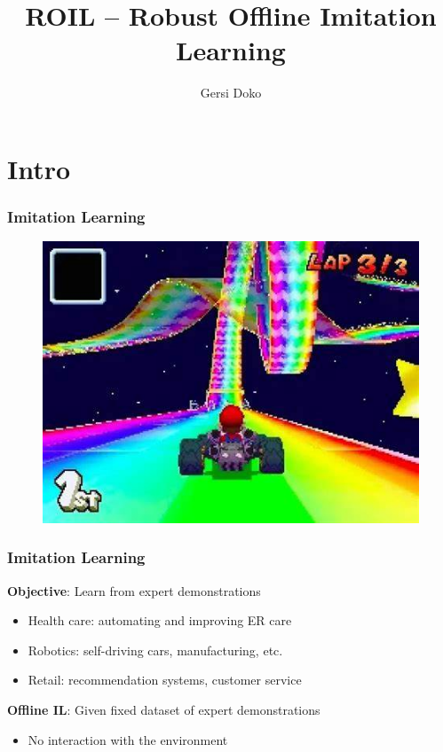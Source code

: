 \documentclass{beamer}
\title{ROIL -- Robust Offline Imitation Learning}
\author{Gersi Doko}
\institute{Department of Computer Science \\ University of New Hampshire}
\date{}
\begin{document}
\frame{\titlepage}

\section*{Intro}

\begin{frame}
	\frametitle{Imitation Learning}
	\centering
	\begin{minipage}{0.9\linewidth}
		\begin{figure}
			\centering
			\includegraphics[width=\linewidth]{plots/rainbow_road.jpeg}
		\end{figure}
	\end{minipage}
\end{frame}

\begin{frame}
	\frametitle{Imitation Learning}
	\textbf{Objective}: Learn from expert demonstrations
	\begin{itemize}
		\item Health care: automating and improving ER care
		\item Robotics: self-driving cars, manufacturing, etc.
		\item Retail: recommendation systems, customer service
	\end{itemize}
	\vfill
	\textbf{Offline IL}: Given fixed dataset of expert demonstrations
	\begin{itemize}
		\item No interaction with the environment
	\end{itemize}
\end{frame}
\end{document}
